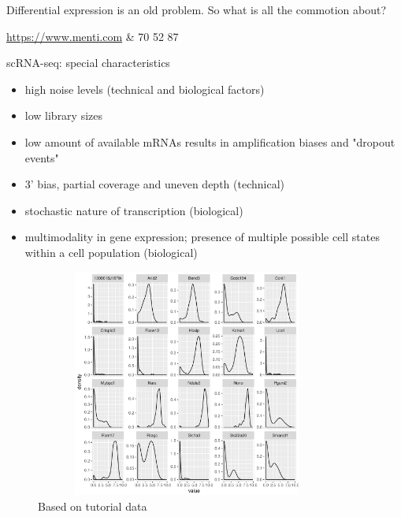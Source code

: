 \documentclass{beamer}\usepackage[]{graphicx}\usepackage[]{color}
\begin{document}
\begin{frame}
\begin{center}
\colorbox{blue!10}{Differential expression is an old problem.}
\colorbox{blue!10}{So what is all the commotion about?}
\end{center}
\begin{center}
\href{https://www.menti.com}{https://www.menti.com} \& 70 52 87 \pause
\end{center}
\vspace{0.5cm}
\begin{block}{scRNA-seq: special characteristics}
\begin{itemize}
 \item high noise levels (technical and biological factors)
  \item low library sizes
  \item low amount of available mRNAs results in amplification biases and "dropout events"
  \item 3' bias, partial coverage and uneven depth (technical)
  \item stochastic nature of transcription (biological)
  \item multimodality in gene expression; presence of multiple possible cell states within a cell population (biological)
 \end{itemize}
\end{block}
\end{frame}

\begin{frame}
\begin{center}
\begin{figure}
\includegraphics[width=10cm, height=7.5cm]{Images/ZeroInflated-biomodal.pdf}
\caption{Based on tutorial data}
\end{figure}
\end{center}
\end{frame}
\end{document}
